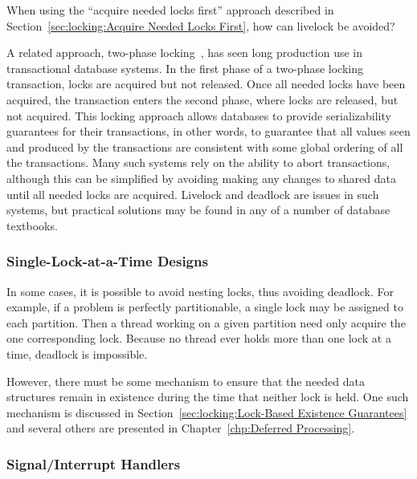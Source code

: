 \QuickQuiz{}
	When using the ``acquire needed locks first'' approach described in
	Section~\ref{sec:locking:Acquire Needed Locks First},
	how can livelock be avoided?
 \QuickQuizEnd

A related approach, two-phase locking~\cite{PhilipABernstein1987},
has seen long production use in transactional database systems.
In the first phase of a two-phase locking transaction, locks are
acquired but not released.
Once all needed locks have been acquired, the transaction enters the
second phase, where locks are released, but not acquired.
This locking approach allows databases to provide serializability
guarantees for their transactions, in other words, to guarantee
that all values seen and produced by the transactions are consistent
with some global ordering of all the transactions.
Many such systems rely on the ability to abort transactions, although
this can be simplified by avoiding making any changes to shared data
until all needed locks are acquired.
Livelock and deadlock are issues in such systems, but practical
solutions may be found in any of a number of database textbooks.

\subsubsection{Single-Lock-at-a-Time Designs}
\label{sec:locking:Single-Lock-at-a-Time Designs}

In some cases, it is possible to avoid nesting locks, thus avoiding
deadlock.
For example, if a problem is perfectly partitionable, a single
lock may be assigned to each partition.
Then a thread working on a given partition need only acquire the one
corresponding lock.
Because no thread ever holds more than one lock at a time,
deadlock is impossible.

However, there must be some mechanism to ensure that the needed data
structures remain in existence during the time that neither lock is
held.
One such mechanism is discussed in
Section~\ref{sec:locking:Lock-Based Existence Guarantees}
and several others are presented in
Chapter~\ref{chp:Deferred Processing}.

\subsubsection{Signal/Interrupt Handlers}
\label{sec:locking:Signal/Interrupt Handlers}

